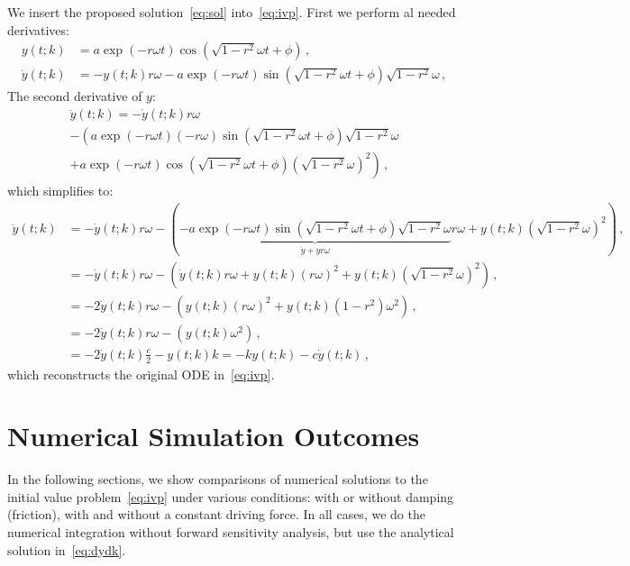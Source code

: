 \documentclass[utf8,english,DIV=12]{scrartcl}
\begin{document}
We insert the proposed solution~\eqref{eq:sol} into~\eqref{eq:ivp}. First we perform al needed derivatives:
\begin{equation}
  \begin{split}
    y(t;k)&=a\exp(-r\omega t)\cos(\sqrt{1-r^2}\omega t+\phi)\,,\\
    \dot y(t;k)&=-y(t;k)r\omega - a\exp(-r\omega t)\sin(\sqrt{1-r^2}\omega t+\phi) \sqrt{1-r^2}\omega\,,
  \end{split}\label{eq:proof}
\end{equation}
The second derivative of $y$:
\begin{multline}
  \ddot y(t;k)=-\dot y(t;k) r\omega \\
  - \left(a\exp(-r\omega t)(-r\omega)\sin(\sqrt{1-r^2}\omega t+\phi) \sqrt{1-r^2}\omega\right.\\
  + \left.a\exp(-r\omega t)\cos(\sqrt{1-r^2}\omega t+\phi) \left(\sqrt{1-r^2}\omega\right)^2\right)\,,  
\end{multline}
which simplifies to:
\begin{equation}
  \label{eq:ddoty}
  \begin{split}
  \ddot y(t;k)&=-\dot y(t;k) r\omega - \left(\underbrace{-a\exp(-r\omega t)\sin(\sqrt{1-r^2}\omega t+\phi)\sqrt{1-r^2}\omega}_{\dot y + yr\omega}   r\omega
    + y(t;k) \left(\sqrt{1-r^2}\omega\right)^2\right)\,, \\
  &=-\dot y(t;k) r\omega - \left(\dot y(t;k)r\omega + y(t;k)(r\omega)^2 
    + y(t;k) \left(\sqrt{1-r^2}\omega\right)^2\right)\,,\\
  &=-2\dot y(t;k) r\omega - \left(y(t;k)(r\omega)^2 
    + y(t;k) (1-r^2)\omega^2\right)\,,\\
  &=-2\dot y(t;k) r\omega - \left(y(t;k)\omega^2\right)\,,\\
  &=-2\dot y(t;k) \frac{c}{2} - y(t;k)k = - k y(t;k) - c\dot y(t;k)\,,
\end{split}
\end{equation}
which reconstructs the original ODE in~\eqref{eq:ivp}.

\section{Numerical Simulation Outcomes}
\label{sec:results}

In the following sections, we show comparisons of numerical solutions
to the initial value problem~\eqref{eq:ivp} under various conditions:
with or without damping (friction), with and without a constant
driving force. In all cases, we do the numerical integration without
forward sensitivity analysis, but use the analytical solution
in~\eqref{eq:dydk}.
\end{document}
